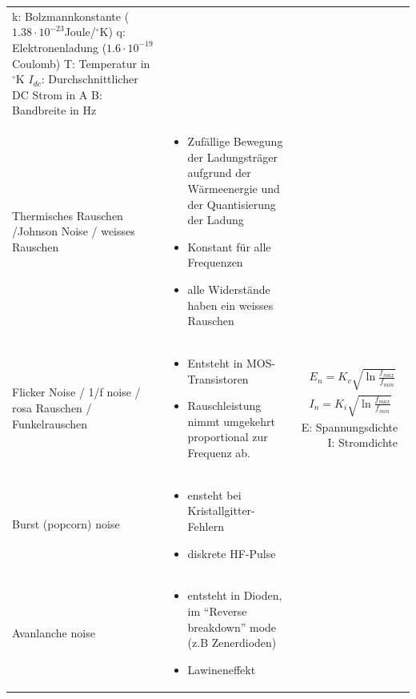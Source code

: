 \begin{longtable}{|p{3.5cm}|p{6cm}|p{8cm}|}
{		k: Bolzmannkonstante ($1.38 \cdot 10^{-23}$Joule/$^\circ$K)\newline
		q: Elektronenladung ($1.6 \cdot 10^{-19}$Coulomb)\newline
		T: Temperatur in $^\circ$K\newline
		$I_{dc}$: Durchschnittlicher DC Strom in A\newline
		B: Bandbreite in Hz
      }
	\\ \hdashline
	Thermisches Rauschen /Johnson Noise / weisses Rauschen
  & \vspace{-1.5\topsep} 
    \begin{itemize}[leftmargin=*]
      \item Zufällige Bewegung der Ladungsträger aufgrund der Wärmeenergie und der Quantisierung der Ladung
      \item Konstant für alle Frequenzen
      \item alle Widerstände haben ein weisses Rauschen
    \end{itemize}
	&
	\\ \hdashline
  	Flicker Noise / 1/f noise / rosa Rauschen / Funkelrauschen
	& \vspace{-1.5\topsep}
      \begin{itemize}[leftmargin=*]
	  	\item Entsteht in MOS-Transistoren
  	  	\item Rauschleistung nimmt umgekehrt proportional zur Frequenz ab.
  	  \end{itemize}
  	& {\begin{gather*}
          E_{n}=K_{v}\sqrt{\ln{\frac{f_{max}}{f_{min}}}}\\
          I_{n}=K_{i}\sqrt{\ln{\frac{f_{max}}{f_{min}}}}
        \end{gather*}}
        E: Spannungsdichte $\qquad$ 
        I: Stromdichte
  \\ \hdashline
    Burst (popcorn) noise &
    \vspace{-1.5\topsep}
    \begin{itemize}
      \item ensteht bei Kristallgitter-Fehlern
      \item diskrete HF-Pulse
    \end{itemize} &
  \\ \hdashline
    Avanlanche noise &
    \vspace{-1.5\topsep}
    \begin{itemize}
      \item entsteht in Dioden, im "`Reverse breakdown"' mode (z.B Zenerdioden)
      \item Lawineneffekt
    \end{itemize} &
	\\ \hline    
\end{longtable}
